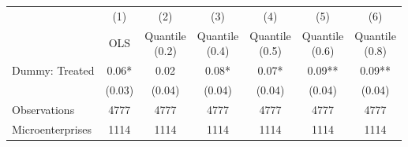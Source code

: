 {
\def\sym#1{\ifmmode^{#1}\else\(^{#1}\)\fi}
\begin{tabular}{l*{6}{c}}
\toprule
                    &\multicolumn{1}{c}{(1)}   &\multicolumn{1}{c}{(2)}   &\multicolumn{1}{c}{(3)}   &\multicolumn{1}{c}{(4)}   &\multicolumn{1}{c}{(5)}   &\multicolumn{1}{c}{(6)}   \\
                    &\specialcell{OLS\\\vphantom{()}}   &\specialcell{Quantile\\(0.2)}   &\specialcell{Quantile\\(0.4)}   &\specialcell{Quantile\\(0.5)}   &\specialcell{Quantile\\(0.6)}   &\specialcell{Quantile\\(0.8)}   \\
\midrule
Dummy: Treated      &        0.06*  &        0.02   &        0.08*  &        0.07*  &        0.09** &        0.09** \\
                    &      (0.03)   &      (0.04)   &      (0.04)   &      (0.04)   &      (0.04)   &      (0.04)   \\
\midrule
Observations        &        4777   &        4777   &        4777   &        4777   &        4777   &        4777   \\
Microenterprises    &        1114   &        1114   &        1114   &        1114   &        1114   &        1114   \\
\bottomrule
\end{tabular}
}
